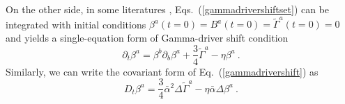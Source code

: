On the other side, in some literatures \cite{vanMeter:2006vi}, Eqs.~(\ref{gammadrivershiftset}) can be integrated with initial conditions $\beta^{a}\left(t=0\right) = B^{a}\left(t=0\right) = {\tilde \Gamma}^{a}\left(t = 0\right) = 0$ and yields a single-equation form of Gamma-driver shift condition
\begin{equation}\label{gammadrivershift}
\partial_{t}\beta^{a} = \beta^{b}\partial_{b}\beta^{a} + \frac{3}{4}{\tilde \Gamma}^{a} - \eta \beta^{a} \ .
\end{equation} 
Similarly, we can write the covariant form of Eq.~(\ref{gammadrivershift}) as
\begin{equation}\label{covariant Gamma-driver shift}
D_{t}\beta^{a} = \frac{3}{4}{\bar \alpha}^{2}\Delta {\tilde \Gamma}^{a} - \eta {\bar \alpha}\Delta\beta^{a} \ .
\end{equation}


